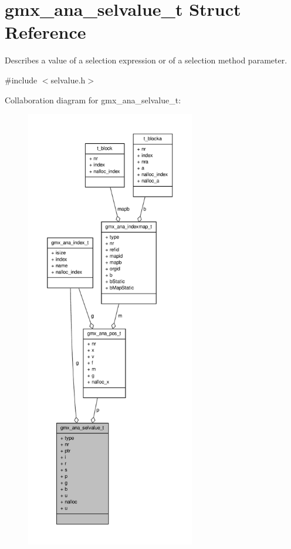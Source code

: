 \hypertarget{structgmx__ana__selvalue__t}{\section{gmx\-\_\-ana\-\_\-selvalue\-\_\-t \-Struct \-Reference}
\label{structgmx__ana__selvalue__t}
}


\-Describes a value of a selection expression or of a selection method parameter.  




{\ttfamily \#include $<$selvalue.\-h$>$}



\-Collaboration diagram for gmx\-\_\-ana\-\_\-selvalue\-\_\-t\-:
\nopagebreak
\begin{figure}[H]
\begin{center}
\leavevmode
\includegraphics[height=550pt]{structgmx__ana__selvalue__t__coll__graph}
\end{center}
\end{figure}
